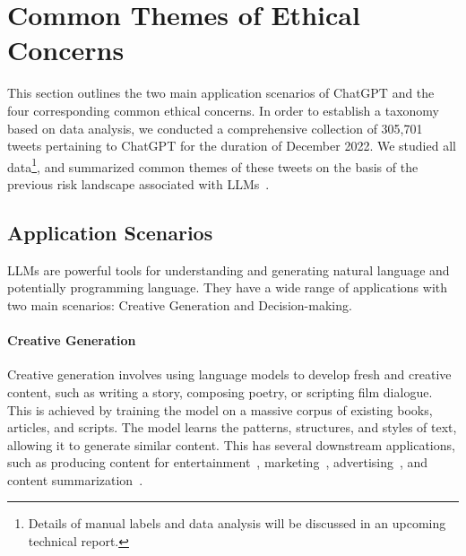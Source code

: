 \section{Common Themes of Ethical Concerns}
\label{sec:2}
This section outlines the two main application scenarios of ChatGPT and the four corresponding common ethical concerns.
In order to establish a taxonomy based on data analysis, we conducted a comprehensive collection of 305,701 tweets pertaining to ChatGPT for the duration of December 2022.
We studied all data\footnote{Details of manual labels and data analysis will be discussed in an upcoming technical report.}, and summarized common themes of these tweets on the basis of the previous risk landscape associated with LLMs~\cite{weidinger2021ethical}.

\subsection{Application Scenarios}
LLMs are powerful tools for understanding and generating natural language and potentially programming language. They have a wide range of applications with two main scenarios: Creative Generation and Decision-making.

\paragraph{Creative Generation}
Creative generation involves using language models to develop fresh and creative content, such as writing a story, composing poetry, or scripting film dialogue. This is achieved by training the model on a massive corpus of existing books, articles, and scripts. The model learns the patterns, structures, and styles of text, allowing it to generate similar content. This has several downstream applications, such as producing content for entertainment~\cite{higashinaka2018role}, marketing~\cite{reisenbichler2022frontiers}, advertising~\cite{bartz2008natural}, and content summarization~\cite{cao2022ai}.

